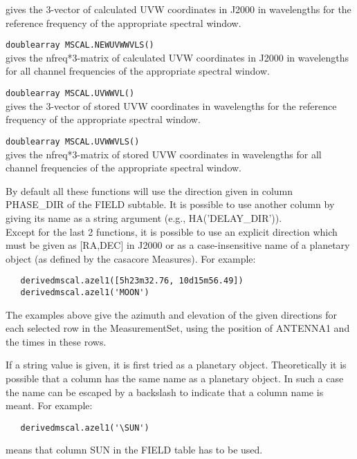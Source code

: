 \begin{description}
    gives the 3-vector of calculated UVW coordinates in J2000 in wavelengths for
    the reference frequency of the appropriate spectral window.
  \item[] \texttt{doublearray MSCAL.NEWUVWWVLS()}\\
    gives the nfreq*3-matrix of calculated UVW coordinates in J2000 in wavelengths for
    all channel frequencies of the appropriate spectral window.
  \item[] \texttt{doublearray MSCAL.UVWWVL()}\\
    gives the 3-vector of stored UVW coordinates in wavelengths for
    the reference frequency of the appropriate spectral window.
  \item[] \texttt{doublearray MSCAL.UVWWVLS()}\\
    gives the nfreq*3-matrix of stored UVW coordinates in wavelengths for
    all channel frequencies of the appropriate spectral window.
\end{description}
By default all these functions will use the direction given in column PHASE\_DIR
of the FIELD subtable. It is possible to use another column by giving
its name as a string argument (e.g., HA('DELAY\_DIR')). 
\\Except for the last 2 functions, it is possible to use an explicit direction which
must be given as [RA,DEC] in J2000 or as a case-insensitive name of a planetary object
(as defined by the casacore Measures).
For example:
\begin{verbatim}
   derivedmscal.azel1([5h23m32.76, 10d15m56.49])
   derivedmscal.azel1('MOON')
\end{verbatim} 
The examples above give the azimuth and elevation of the given directions for each
selected row in the MeasurementSet, using the position of ANTENNA1 and the
times in these rows. 

If a string value is given, it is first tried as a planetary object.
Theoretically it is possible that a column has the same name as a
planetary object. In such a case the name can be escaped by a backslash
to indicate that a column name is meant.
For example:
\begin{verbatim}
   derivedmscal.azel1('\SUN')
\end{verbatim}
means that column SUN in the FIELD table has to be used.

